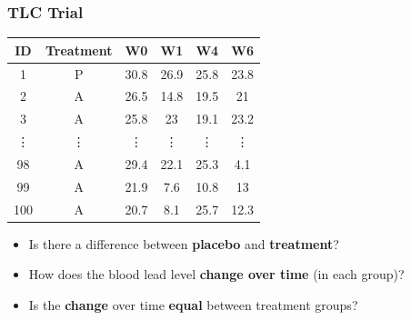 \subsubsection{TLC Trial}
\begin{table}[H]
    \centering
    \begin{tabular}{cccccc}
        \toprule
        ID     & Treatment & W0     & W1     & W4     & W6     \\
        \midrule
        1      & P         & 30.8   & 26.9   & 25.8   & 23.8   \\
        2      & A         & 26.5   & 14.8   & 19.5   & 21     \\
        3      & A         & 25.8   & 23     & 19.1   & 23.2   \\
        \vdots & \vdots    & \vdots & \vdots & \vdots & \vdots \\
        98     & A         & 29.4   & 22.1   & 25.3   & 4.1    \\
        99     & A         & 21.9   & 7.6    & 10.8   & 13     \\
        100    & A         & 20.7   & 8.1    & 25.7   & 12.3   \\
        \bottomrule
    \end{tabular}
\end{table}
\begin{itemize}
    \item Is there a difference between \textbf{placebo} and \textbf{treatment}?
    \item How does the blood lead level \textbf{change over time} (in each group)?
    \item Is the \textbf{change} over time \textbf{equal} between treatment groups?
\end{itemize}
